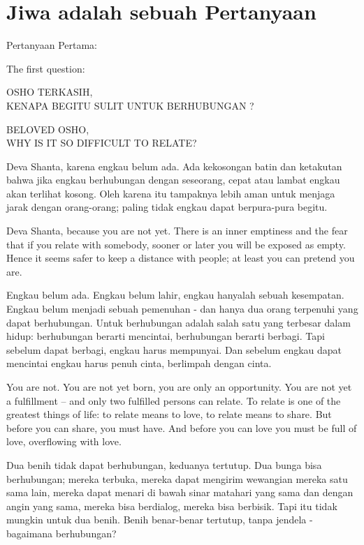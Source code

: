 \chapter{Jiwa adalah sebuah Pertanyaan} %

\bahasa
Pertanyaan Pertama:

\english
The first question:

\bahasa
OSHO TERKASIH,\\
KENAPA BEGITU SULIT UNTUK BERHUBUNGAN ?

\english
BELOVED OSHO,\\
WHY IS IT SO DIFFICULT TO RELATE?

\bahasa
Deva Shanta, karena engkau belum ada. Ada kekosongan batin dan ketakutan bahwa jika engkau berhubungan dengan seseorang, cepat atau lambat engkau akan terlihat kosong. Oleh karena itu tampaknya lebih aman untuk menjaga jarak dengan orang-orang; paling tidak engkau dapat berpura-pura begitu.

\english
Deva Shanta, because you are not yet. There is an inner emptiness and the fear that if you relate with somebody, sooner or later you will be exposed as empty. Hence it seems safer to keep a distance with people; at least you can pretend you are.

\bahasa
Engkau belum ada. Engkau belum lahir, engkau hanyalah sebuah kesempatan. Engkau belum menjadi sebuah pemenuhan - dan hanya dua orang terpenuhi yang dapat berhubungan. Untuk berhubungan adalah salah satu yang terbesar dalam hidup: berhubungan berarti mencintai, berhubungan berarti berbagi. Tapi sebelum dapat berbagi, engkau harus mempunyai. Dan sebelum engkau dapat mencintai engkau harus penuh cinta, berlimpah dengan cinta.

\english
You are not. You are not yet born, you are only an opportunity. You are not yet a fulfillment -- and only two fulfilled persons can relate. To relate is one of the greatest things of life: to relate means to love, to relate means to share. But before you can share, you must have. And before you can love you must be full of love, overflowing with love.

\bahasa
Dua benih tidak dapat berhubungan, keduanya tertutup. Dua bunga bisa berhubungan; mereka terbuka, mereka dapat mengirim wewangian mereka satu sama lain, mereka dapat menari di bawah sinar matahari yang sama dan dengan angin yang sama, mereka bisa berdialog, mereka bisa berbisik. Tapi itu tidak mungkin untuk dua benih. Benih benar-benar tertutup, tanpa jendela - bagaimana berhubungan?


